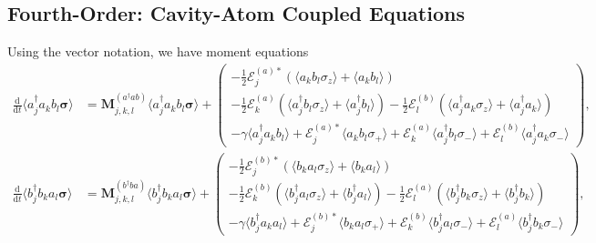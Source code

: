 \documentclass{article}
\newcommand{\ddt}[1][]{\frac{\mathrm{d} #1}{\mathrm{d}t}}
\begin{document}
\subsection{Fourth-Order: Cavity-Atom Coupled Equations}

Using the vector notation, we have moment equations
\begin{subequations}
	\begin{align}
		\ddt \langle a^{\dagger}_{j} a_{k} b_{l} \bm{\sigma} \rangle &= \bm{M}_{j, k, l}^{(a^{\dagger} a b)} \langle a^{\dagger}_{j} a_{k} b_{l} \bm{\sigma} \rangle + 
		\begin{pmatrix}
			-\frac{1}{2} \mathcal{E}_{j}^{(a) *} \left( \langle a_{k} b_{l} \sigma_{z} \rangle + \langle a_{k} b_{l} \rangle \right) \\
			-\frac{1}{2} \mathcal{E}_{k}^{(a)} \left( \langle a^{\dagger}_{j} b_{l} \sigma_{z} \rangle + \langle a^{\dagger}_{j} b_{l} \rangle \right) - \frac{1}{2} \mathcal{E}_{l}^{(b)} \left( \langle a^{\dagger}_{j} a_{k} \sigma_{z} \rangle + \langle a^{\dagger}_{j} a_{k} \rangle \right) \\
			-\gamma \langle a^{\dagger}_{j} a_{k} b_{l} \rangle + \mathcal{E}_{j}^{(a) *} \langle a_{k} b_{l} \sigma_{+} \rangle + \mathcal{E}_{k}^{(a)} \langle a^{\dagger}_{j} b_{l} \sigma_{-} \rangle + \mathcal{E}_{l}^{(b)} \langle a^{\dagger}_{j} a_{k} \sigma_{-} \rangle
		\end{pmatrix}, \\
		\ddt \langle b^{\dagger}_{j} b_{k} a_{l} \bm{\sigma} \rangle &= \bm{M}_{j, k, l}^{(b^{\dagger} b a)} \langle b^{\dagger}_{j} b_{k} a_{l} \bm{\sigma} \rangle + 
		\begin{pmatrix}
			-\frac{1}{2} \mathcal{E}_{j}^{(b) *} \left( \langle b_{k} a_{l} \sigma_{z} \rangle + \langle b_{k} a_{l} \rangle \right) \\
			-\frac{1}{2} \mathcal{E}_{k}^{(b)} \left( \langle b^{\dagger}_{j} a_{l} \sigma_{z} \rangle + \langle b^{\dagger}_{j} a_{l} \rangle \right) - \frac{1}{2} \mathcal{E}_{l}^{(a)} \left( \langle b^{\dagger}_{j} b_{k} \sigma_{z} \rangle + \langle b^{\dagger}_{j} b_{k} \rangle \right) \\
			-\gamma \langle b^{\dagger}_{j} a_{k} a_{l} \rangle + \mathcal{E}_{j}^{(b) *} \langle b_{k} a_{l} \sigma_{+} \rangle + \mathcal{E}_{k}^{(b)} \langle b^{\dagger}_{j} a_{l} \sigma_{-} \rangle + \mathcal{E}_{l}^{(a)} \langle b^{\dagger}_{j} b_{k} \sigma_{-} \rangle
		\end{pmatrix},
	\end{align}
\end{subequations}
\end{document}

